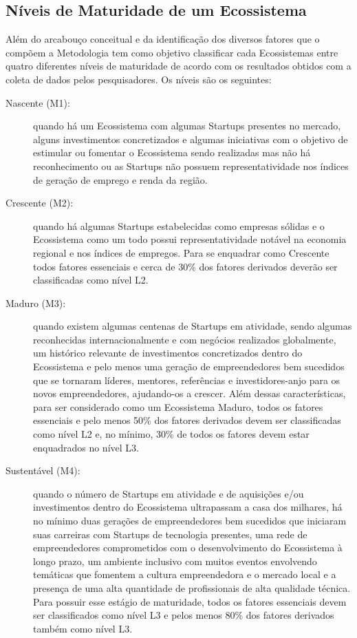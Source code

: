 \subsection{Níveis de Maturidade de um Ecossistema}
\label{subsection:niveis_de_maturidade_de_um_ecossistema}

Além do arcabouço conceitual e da identificação dos diversos fatores que o compõem a Metodologia tem como objetivo classificar cada Ecossistemas entre quatro diferentes níveis de maturidade de acordo com os resultados obtidos com a coleta de dados pelos pesquisadores. Os níveis são os seguintes:

\begin{description}
  \item [Nascente (M1):] quando há um Ecossistema com algumas Startups presentes no mercado, alguns investimentos concretizados e algumas iniciativas com o objetivo de estimular ou fomentar o Ecossistema sendo realizadas mas não há reconhecimento ou as Startups não possuem representatividade nos índices de geração de emprego e renda da região.

  \item [Crescente (M2):] quando há algumas Startups estabelecidas como empresas sólidas e o Ecossistema como um todo possui representatividade notável na economia regional e nos índices de empregos. Para se enquadrar como Crescente todos fatores essenciais e cerca de 30\% dos fatores derivados deverão ser classificadas como nível L2.

  \item [Maduro (M3):] quando existem algumas centenas de Startups em atividade, sendo algumas reconhecidas internacionalmente e com negócios realizados globalmente, um histórico relevante de investimentos concretizados dentro do Ecossistema e pelo menos uma geração de empreendedores bem sucedidos que se tornaram líderes, mentores, referências e investidores-anjo para os novos empreendedores, ajudando-os a crescer. Além dessas características, para ser considerado como um Ecossistema Maduro, todos os fatores essenciais e pelo menos 50\% dos fatores derivados devem ser classificadas como nível L2 e, no mínimo, 30\% de todos os fatores devem estar enquadrados no nível L3.

  \item [Sustentável (M4):] quando o número de Startups em atividade e de aquisições e/ou investimentos dentro do Ecossistema ultrapassam a casa dos milhares, há no mínimo duas gerações de empreendedores bem sucedidos que iniciaram suas carreiras com Startups de tecnologia presentes, uma rede de empreendedores comprometidos com o desenvolvimento do Ecossistema à longo prazo, um ambiente inclusivo com muitos eventos envolvendo temáticas que fomentem a cultura empreendedora e o mercado local e a presença de uma alta quantidade de profissionais de alta qualidade técnica. Para possuir esse estágio de maturidade, todos os fatores essenciais devem ser classificados como nível L3 e pelos menos 80\% dos fatores derivados também como nível L3.
\end{description}

